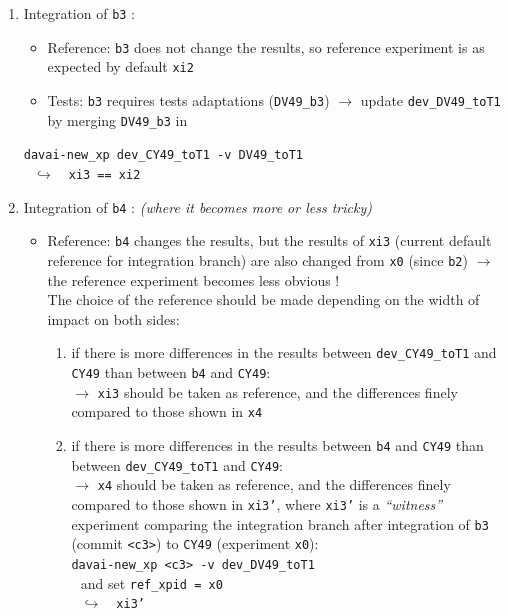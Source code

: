 \documentclass[a4paper,10pt,twoside]{article}
\begin{document}
\begin{appendix}
\begin{enumerate}[label=(\arabic*)]
 \item Integration of \texttt{b3} :
 \begin{itemize}
  \item Reference: \texttt{b3} does not change the results, so reference experiment is as expected by default \texttt{xi2}
  \item Tests: \texttt{b3} requires tests adaptations (\texttt{DV49\_b3}) $\rightarrow$ update \texttt{dev\_DV49\_toT1} by merging \texttt{DV49\_b3} in
 \end{itemize}
 \texttt{davai-new\_xp dev\_CY49\_toT1 -v DV49\_toT1}\\
 $~~~\hookrightarrow~~~$ \texttt{xi3 == xi2}
 
 \item Integration of \texttt{b4} : \textit{(where it becomes more or less tricky)}
 \begin{itemize}
  \item Reference: \texttt{b4} changes the results, but the results of \texttt{xi3} (current default reference for integration branch) are also changed from \texttt{x0} (since \texttt{b2}) $\rightarrow$ the reference experiment becomes less obvious !\\
  The choice of the reference should be made depending on the width of impact on both sides:
  \begin{enumerate}[label=\alph*)]
   \item if there is more differences in the results between \texttt{dev\_CY49\_toT1} and \texttt{CY49} than between \texttt{b4} and \texttt{CY49}:\\
   $\rightarrow$ \texttt{xi3} should be taken as reference, and the differences finely compared to those shown in \texttt{x4}
   \item if there is more differences in the results between \texttt{b4} and \texttt{CY49} than between \texttt{dev\_CY49\_toT1} and \texttt{CY49}:\\
   $\rightarrow$ \texttt{x4} should be taken as reference, and the differences finely compared to those shown in \texttt{xi3'}, where \texttt{xi3'} is a \textit{``witness''} experiment comparing the integration branch after integration of \texttt{b3} (commit \texttt{<c3>}) to \texttt{CY49} (experiment \texttt{x0}):\\
   \texttt{davai-new\_xp <c3> -v dev\_DV49\_toT1}\\
   $~~~$and set \texttt{ref\_xpid = x0}\\
   $~~~\hookrightarrow~~~$ \texttt{xi3'}
  \end{enumerate}

\end{itemize}
\end{enumerate}
\end{appendix}
\end{document}
